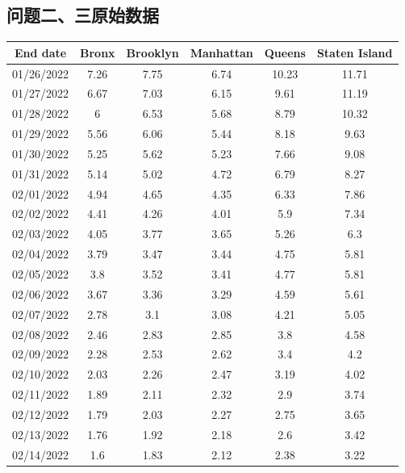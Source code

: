 \documentclass[withoutpreface,bwprint]{cumcmthesis} %
\begin{document}
\begin{appendices}
\subsection{问题二、三原始数据}
\begin{center}
\begin{longtable}{c|ccccc}
\toprule
End date   & Bronx & Brooklyn & Manhattan & Queens & Staten Island \\
\midrule
01/26/2022 & 7.26  & 7.75     & 6.74      & 10.23  & 11.71         \\
01/27/2022 & 6.67  & 7.03     & 6.15      & 9.61   & 11.19         \\
01/28/2022 & 6     & 6.53     & 5.68      & 8.79   & 10.32         \\
01/29/2022 & 5.56  & 6.06     & 5.44      & 8.18   & 9.63          \\
01/30/2022 & 5.25  & 5.62     & 5.23      & 7.66   & 9.08          \\
01/31/2022 & 5.14  & 5.02     & 4.72      & 6.79   & 8.27          \\
02/01/2022 & 4.94  & 4.65     & 4.35      & 6.33   & 7.86          \\
02/02/2022 & 4.41  & 4.26     & 4.01      & 5.9    & 7.34          \\
02/03/2022 & 4.05  & 3.77     & 3.65      & 5.26   & 6.3           \\
02/04/2022 & 3.79  & 3.47     & 3.44      & 4.75   & 5.81          \\
02/05/2022 & 3.8   & 3.52     & 3.41      & 4.77   & 5.81          \\
02/06/2022 & 3.67  & 3.36     & 3.29      & 4.59   & 5.61          \\
02/07/2022 & 2.78  & 3.1      & 3.08      & 4.21   & 5.05          \\
02/08/2022 & 2.46  & 2.83     & 2.85      & 3.8    & 4.58          \\
02/09/2022 & 2.28  & 2.53     & 2.62      & 3.4    & 4.2           \\
02/10/2022 & 2.03  & 2.26     & 2.47      & 3.19   & 4.02          \\
02/11/2022 & 1.89  & 2.11     & 2.32      & 2.9    & 3.74          \\
02/12/2022 & 1.79  & 2.03     & 2.27      & 2.75   & 3.65          \\
02/13/2022 & 1.76  & 1.92     & 2.18      & 2.6    & 3.42          \\
02/14/2022 & 1.6   & 1.83     & 2.12      & 2.38   & 3.22          \\

\end{longtable}
\end{center}
\end{appendices}
\end{document}
